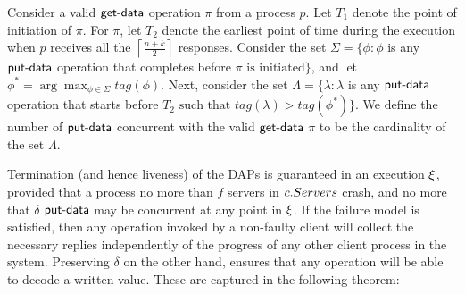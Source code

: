 				
				\begin{definition} \label{defn:concurrent}
					Consider a valid $\act{get-data}$ operation $\pi$ from a process $p$. 
					Let $T_1$ denote the point of initiation of $\pi$. For $\pi$, let $T_2$ denote the earliest point of time during the execution when $p$ 
					receives all the $\left\lceil \frac{n+k}{2} \right\rceil$ responses.
					Consider the set $\Sigma = \{ \phi: \phi$ is any $\act{put-data}$ operation that completes before $\pi \text{ is initiated} \}$, and let $\phi^* = \arg\max_{\phi \in \Sigma}tag(\phi)$. Next, consider the set $\Lambda = \{\lambda:  \lambda$  is any $\act{put-data}$ operation that starts before $T_2 \text{ such that } tag(\lambda) > tag(\phi^*)\}$. We define the number of $\act{put-data}$ concurrent with the valid $\act{get-data}$  $\pi$ to be the cardinality of the set $\Lambda$.
				\end{definition}
							
Termination (and hence liveness)  of the DAPs is guaranteed in an execution $\EX$, provided that a process 
	no more than $f$ servers in $c.Servers$ crash, and no more that $\delta$ $\act{put-data}$ may be concurrent at any point in $\EX$. 
	If the failure model is satisfied, then any operation invoked by a non-faulty client will collect the necessary replies
	independently of the progress of any other client process in the system. Preserving $\delta$ on the other hand,
	ensures that any operation will be able to decode a written value. These are captured in the following theorem:

